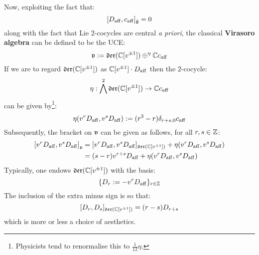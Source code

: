         Now, exploiting the fact that:
            $$[D_{\mathrm{aff}}, c_{\mathrm{aff}}]_{\hat{\mathfrak{g}}} = 0$$
        along with the fact that Lie $2$-cocycles are central \textit{a priori}, the classical \textbf{Virasoro algebra} can be defined to be the UCE:
            $$\mathfrak{v} := \mathfrak{der}(\mathbb{C}[v^{\pm 1}]) \oplus^{\eta} \mathbb{C} c_{\mathrm{aff}}$$
        If we are to regard $\mathfrak{der}(\mathbb{C}[v^{\pm 1}])$ as $\mathbb{C}[v^{\pm 1}] \cdot D_{\mathrm{aff}}$ then the $2$-cocycle:
            $$\eta: \bigwedge^2 \mathfrak{der}(\mathbb{C}[v^{\pm 1}]) \to \mathbb{C} c_{\mathrm{aff}}$$
        can be given by\footnote{Physicists tend to renormalise this to $\frac{1}{12} \eta$.}:
            $$\eta(v^r D_{\mathrm{aff}}, v^s D_{\mathrm{aff}}) := (r^3 - r) \delta_{r + s, 0} c_{\mathrm{aff}}$$
        Subsequently, the bracket on $\mathfrak{v}$ can be given as follows, for all $r, s \in \mathbb{Z}$:
            $$
                \begin{aligned}
                    \left[ v^r D_{\mathrm{aff}}, v^s D_{\mathrm{aff}} \right]_{\mathfrak{v}} & = [ v^r D_{\mathrm{aff}}, v^s D_{\mathrm{aff}} ]_{\mathfrak{der}(\mathbb{C}[v^{\pm 1}])} + \eta(v^r D_{\mathrm{aff}}, v^s D_{\mathrm{aff}})
                    \\
                    & = (s - r) v^{r + s} D_{\mathrm{aff}} + \eta(v^r D_{\mathrm{aff}}, v^s D_{\mathrm{aff}})
                \end{aligned}
            $$
        Typically, one endows $\mathfrak{der}(\mathbb{C}[v^{\pm 1}])$ with the basis:
            $$\{ D_r := -v^r D_{\mathrm{aff}} \}_{r \in \mathbb{Z}}$$
        The inclusion of the extra minus sign is so that:
            $$[D_r, D_s]_{\mathfrak{der}(\mathbb{C}[v^{\pm 1}])} = (r - s) D_{r + s}$$
        which is more or less a choice of aesthetics.

